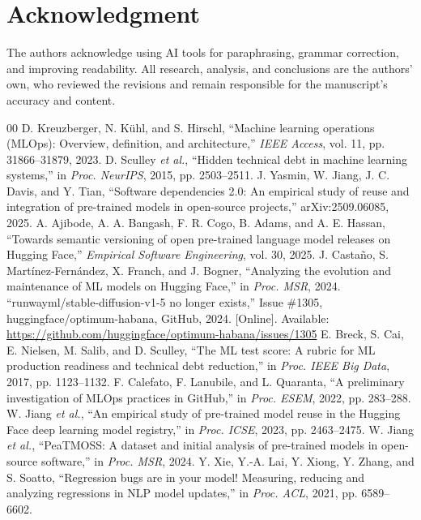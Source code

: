 \documentclass[conference]{IEEEtran}
\begin{document}
\section*{Acknowledgment}
The authors acknowledge using AI tools for paraphrasing, grammar correction, and improving readability. All research, analysis, and conclusions are the authors' own, who reviewed the revisions and remain responsible for the manuscript's accuracy and content.

\begin{thebibliography}{00}
\footnotesize
{} D. Kreuzberger, N. K\"{u}hl, and S. Hirschl, ``Machine learning operations (MLOps): Overview, definition, and architecture,'' \emph{IEEE Access}, vol. 11, pp. 31866--31879, 2023.
 D. Sculley \emph{et al.}, ``Hidden technical debt in machine learning systems,'' in \emph{Proc. NeurIPS}, 2015, pp. 2503--2511.
 J. Yasmin, W. Jiang, J. C. Davis, and Y. Tian, ``Software dependencies 2.0: An empirical study of reuse and integration of pre-trained models in open-source projects,'' arXiv:2509.06085, 2025.
 A. Ajibode, A. A. Bangash, F. R. Cogo, B. Adams, and A. E. Hassan, ``Towards semantic versioning of open pre-trained language model releases on Hugging Face,'' \emph{Empirical Software Engineering}, vol. 30, 2025.
 J. Casta\~{n}o, S. Mart\'{i}nez-Fern\'{a}ndez, X. Franch, and J. Bogner, ``Analyzing the evolution and maintenance of ML models on Hugging Face,'' in \emph{Proc. MSR}, 2024.
 ``runwayml/stable-diffusion-v1-5 no longer exists,'' Issue \#1305, huggingface/optimum-habana, GitHub, 2024. [Online]. Available: \url{https://github.com/huggingface/optimum-habana/issues/1305}
 E. Breck, S. Cai, E. Nielsen, M. Salib, and D. Sculley, ``The ML test score: A rubric for ML production readiness and technical debt reduction,'' in \emph{Proc. IEEE Big Data}, 2017, pp. 1123--1132.
 F. Calefato, F. Lanubile, and L. Quaranta, ``A preliminary investigation of MLOps practices in GitHub,'' in \emph{Proc. ESEM}, 2022, pp. 283--288.
 W. Jiang \emph{et al.}, ``An empirical study of pre-trained model reuse in the Hugging Face deep learning model registry,'' in \emph{Proc. ICSE}, 2023, pp. 2463--2475.
 W. Jiang \emph{et al.}, ``PeaTMOSS: A dataset and initial analysis of pre-trained models in open-source software,'' in \emph{Proc. MSR}, 2024.
 Y. Xie, Y.-A. Lai, Y. Xiong, Y. Zhang, and S. Soatto, ``Regression bugs are in your model! Measuring, reducing and analyzing regressions in NLP model updates,'' in \emph{Proc. ACL}, 2021, pp. 6589--6602.

\end{thebibliography}
\end{document}
